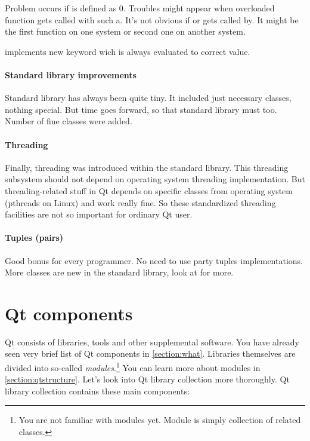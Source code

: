 Problem occurs if is defined as $0$. Troubles might appear when overloaded function gets called with such a. It's not obvious if or gets called by. It might be the first function on one system or second one on another system.

 implements new keyword wich is always evaluated to correct value.

\paragraph{Standard library improvements}
Standard library has always been quite tiny. It included just necessary classes, nothing special. But time goes forward, so that standard library must too. Number of fine classes were added.

\paragraph*{Threading}
Finally, threading was introduced within the standard library. This threading subsystem should not depend on operating system threading implementation. But threading-related stuff in Qt depends on specific classes from operating system (pthreads on Linux) and work really fine. So these standardized threading facilities are not so important for ordinary Qt user.

\paragraph*{Tuples (pairs)}
Good bonus for every \cpp{} programmer. No need to use  party tuples implementations. More classes are new in the standard library, look at \citep{various:cppstandard} for more.

\section{Qt components}\label{section:components}
Qt consists of libraries, tools and other supplemental software. You have already seen very brief list of Qt components in \autoref{section:what}. Libraries themselves are divided into so-called \textit{modules}.\footnote{You are not familiar with modules yet. Module is simply collection of related classes.} You can learn more about modules in \autoref{section:qtstructure}. Let's look into Qt library collection more thoroughly. Qt library collection contains these main components:

